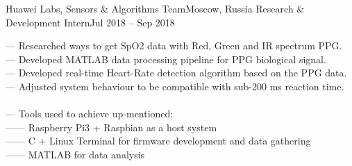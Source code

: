     \resumeSubheading
      {Huawei Labs, Sensors \& Algorithms Team}{Moscow, Russia}
      {Research \& Development Intern}{Jul 2018 -- Sep 2018}
      \begin{itemize}[leftmargin=0in, label={}]
            \small{\item{
                {— Researched ways to get SpO2 data with Red, Green and IR spectrum PPG.}\\
                {— Developed MATLAB data processing pipeline for PPG biological signal.}\\
                {— Developed real-time Heart-Rate detection algorithm based on the PPG data.}\\
                {— Adjusted system behaviour to be compatible with sub-200 ms reaction time. }\\
                {\ }\\
                {— Tools used to achieve up-mentioned:}\\
                {—— Raspberry Pi3 + Raspbian as a host system }\\
                {—— C + Linux Terminal for firmware development and data gathering}\\
                {—— MATLAB for data analysis}\\
            }}
      \end{itemize}